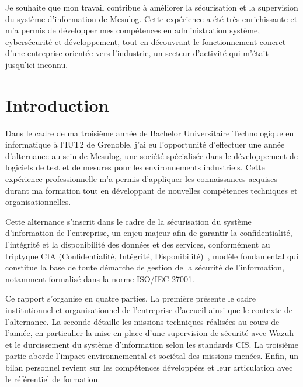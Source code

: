 \documentclass[a4paper, 11pt]{article}
\begin{document}
\vspace{\baselineskip} %

Je souhaite que mon travail contribue à améliorer la sécurisation et la supervision du système d'information de Mesulog. Cette expérience a été très enrichissante et m’a permis de développer mes compétences en administration système, cybersécurité et développement, tout en découvrant le fonctionnement concret d’une entreprise orientée vers l'industrie, un secteur d'activité qui m'était jusqu'ici inconnu.
 \newpage




	

\thispagestyle{empty}

\tableofcontents
\newpage
\listoffigures
\newpage



\section*{Introduction}
Dans le cadre de ma troisième année de Bachelor Universitaire Technologique en informatique à l'IUT2 de Grenoble, j'ai eu l'opportunité d'effectuer une année d'alternance au sein
 de Mesulog, une société spécialisée dans le développement de logiciels de test et de mesures pour les environnements industriels. Cette expérience professionnelle
  m'a permis d'appliquer les connaissances acquises durant ma formation tout en développant de nouvelles compétences techniques et organisationnelles.

 \par\bigskip
Cette alternance s'inscrit dans le cadre de la sécurisation du système d'information de l'entreprise, un enjeu majeur afin de garantir la 
confidentialité, l'intégrité et la disponibilité des données et des services, conformément au triptyque 
CIA (Confidentialité, Intégrité, Disponibilité)~\cite{cia-triad}, modèle fondamental qui constitue la base de toute démarche de gestion
 de la sécurité de l'information, notamment formalisé dans la norme ISO/IEC 27001.
\par\bigskip

Ce rapport s'organise en quatre parties. La première présente le cadre institutionnel et organisationnel de l'entreprise d'accueil 
ainsi que le contexte de l'alternance. La seconde détaille les missions techniques réalisées au cours de l'année, en particulier la
 mise en place d'une supervision de sécurité avec Wazuh et le durcissement du système d'information selon les standards CIS. 
 La troisième partie aborde l'impact environnemental et sociétal des missions menées. Enfin, un bilan personnel revient sur les 
 compétences développées et leur articulation avec le référentiel de formation.
\end{document}

